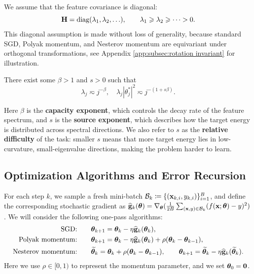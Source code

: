 \documentclass[11pt]{article}
\begin{document}
\begin{assumption}
\label{ass:diagonal-covariance}
We assume that the feature covariance is diagonal:
\begin{equation}
\label{eqn:diagonal-hessian}
\mathbf{H}=
\operatorname{diag}(\lambda_1,\lambda_2,\ldots),
\qquad
\lambda_1\geqslant\lambda_2\geqslant\cdots>0.
\end{equation}
This diagonal assumption is made without loss of generality, because standard SGD, Polyak momentum, and Nesterov momentum are equivariant under orthogonal transformations, see Appendix \ref{app:subsec:rotation invariant} for illustration.
\end{assumption}
\begin{assumption} \label{ass:power-law}
    There exist some $\beta>1$ and $s>0$ such that 
    \[
        \lambda_j \eqsim j^{-\beta},\quad \lambda_j |\theta^*_j|^2\eqsim j^{-(1+s\beta)}.
    \]
\end{assumption}
Here \(\beta\) is the \textbf{capacity exponent}, which controls the decay rate of the feature spectrum, and \(s\) is the \textbf{source exponent}, which describes how the target energy is distributed across spectral directions. 
We also refer to \(s\) as the \textbf{relative difficulty} of the task: smaller \(s\) means that more target energy lies in low-curvature, small-eigenvalue directions, making the problem harder to learn.

\subsection{Optimization Algorithms and Error Recursion}
\label{sec:err recursion}
For each step \(k\), we sample a fresh mini-batch $\mathcal{B}_k \coloneqq \{(\mathbf{x}_{k,i}, y_{k,i})\}_{i=1}^{B}$, and define the corresponding stochastic gradient as $\widehat{\mathbf{g}}_k(\bm{\theta}) = \nabla_{\bm{\theta}}(\tfrac{1}{2B}\sum_{(\mathbf{x},y)\in\mathcal{B}_k}(f(\mathbf{x};\bm{\theta})-y)^2)$. We will consider the following one-pass algorithms:
\begin{align}
\textnormal{SGD:}&\qquad
\bm{\theta}_{k+1}
=
\bm{\theta}_k-\eta\widehat{\mathbf{g}}_k(\bm{\theta}_k),
\label{eq:sgd-update}
\\
\textnormal{Polyak momentum:}&\qquad
\bm{\theta}_{k+1}
=
\bm{\theta}_k-\eta\widehat{\mathbf{g}}_k(\bm{\theta}_k)
+\rho(\bm{\theta}_k-\bm{\theta}_{k-1}),
\label{eq:hb-update}
\\
\textnormal{Nesterov momentum:}&\qquad
\widetilde{\bm{\theta}}_k
=
\bm{\theta}_k+\rho(\bm{\theta}_k-\bm{\theta}_{k-1}),\qquad
\bm{\theta}_{k+1}
=
\widetilde{\bm{\theta}}_k
-\eta\widehat{\mathbf{g}}_k(\widetilde{\bm{\theta}}_k).
\label{eq:nag-update}
\end{align}
Here we use \(\rho\in[0,1)\) to represent the momentum parameter, and we set \(\bm{\theta}_0=\bm0\).
\end{document}
